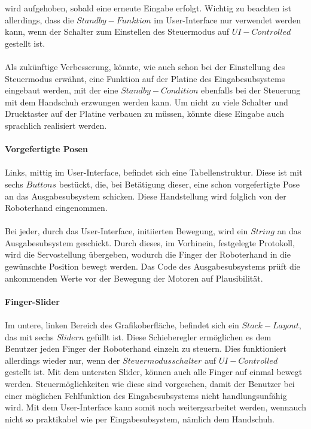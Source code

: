 \documentclass[titlepage,12pt,twoside]{article}
\begin{document}
wird aufgehoben, sobald eine erneute Eingabe erfolgt. Wichtig zu beachten ist allerdings, dass die $Standby-Funktion$ im User-Interface nur verwendet werden kann, wenn der Schalter zum Einstellen des 
Steuermodus auf $UI-Controlled$ gestellt ist. \\
\\
Als zukünftige Verbesserung, könnte, wie auch schon bei der Einstellung des Steuermodus erwähnt, eine Funktion auf der Platine des Eingabesubsystems eingebaut werden, mit der eine $Standby-Condition$
ebenfalls bei der Steuerung mit dem Handschuh erzwungen werden kann. Um nicht zu viele Schalter und Drucktaster auf der Platine verbauen zu müssen, könnte diese Eingabe auch sprachlich realisiert werden. \\
\\
\textbf{Vorgefertigte Posen} \\
\\
Links, mittig im User-Interface, befindet sich eine Tabellenstruktur. Diese ist mit sechs $Buttons$ bestückt, die, bei Betätigung dieser, eine schon vorgefertigte Pose an das Ausgabesubsystem schicken. Diese Handstellung
wird folglich von der Roboterhand eingenommen. \\
\\
Bei jeder, durch das User-Interface, initiierten Bewegung, wird ein $String$ an das Ausgabesubsystem geschickt. Durch dieses, im Vorhinein, festgelegte Protokoll, wird die Servostellung übergeben, wodurch die Finger der
Roboterhand in die gewünschte Position bewegt werden. Das Code des Ausgabesubsystems prüft die ankommenden Werte vor der Bewegung der Motoren auf Plausibilität. \\
\\
\hfill \break
\hfill \break
\hfill \break
\hfill \break
\hfill \break
\textbf{Finger-Slider} \\
\\
Im untere, linken Bereich des Grafikoberfläche, befindet sich ein $Stack-Layout$, das mit sechs $Slidern$ gefüllt ist. Diese Schieberegler ermöglichen es dem Benutzer jeden Finger der Roboterhand einzeln zu steuern. Dies
funktioniert allerdings wieder nur, wenn der $Steuermodusschalter$ auf $UI-Controlled$ gestellt ist. Mit dem untersten Slider, können auch alle Finger auf einmal bewegt werden. Steuermöglichkeiten wie diese sind vorgesehen, 
damit der Benutzer bei einer möglichen Fehlfunktion des Eingabesubsystems nicht handlungsunfähig wird. Mit dem User-Interface kann somit noch weitergearbeitet werden, wennauch nicht so praktikabel wie per Eingabesubsystem, nämlich dem Handschuh. \\
\end{document}
